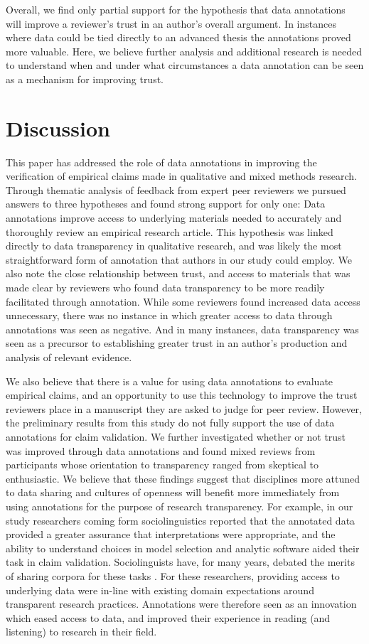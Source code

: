 \documentclass[sigchi]{acmart}
\begin{document}
Overall, we find only partial support for the hypothesis that data annotations will improve a reviewer’s trust in an author’s overall argument. In instances where data could be tied directly to an advanced thesis the annotations proved more valuable. Here, we believe further analysis and additional research is needed to understand when and under what circumstances a data annotation can be seen as a mechanism for improving trust.  

\section{Discussion}
This paper has addressed the role of data annotations in improving the verification of empirical claims made in qualitative and mixed methods research. Through thematic analysis of feedback from expert peer reviewers we pursued answers to three hypotheses and found strong support for only one: Data annotations improve access to underlying materials needed to accurately and thoroughly review an empirical research article. This hypothesis was linked directly to data transparency in qualitative research, and was likely the most straightforward form of annotation that authors in our study could employ. We also note the close relationship between trust, and access to materials that was made clear by reviewers who found data transparency to be more readily facilitated through annotation. While some reviewers found increased data access unnecessary, there was no instance in which greater access to data through annotations was seen as negative. And in many instances, data transparency was seen as a precursor to establishing greater trust in an author's production and analysis of relevant evidence. 

We also believe that there is a value for using data annotations to evaluate empirical claims, and an opportunity to use this technology to improve the trust reviewers place in a manuscript they are asked to judge for peer review. However, the preliminary results from this study do not fully support the use of data annotations for claim validation. We further investigated whether or not trust was improved through data annotations and found mixed reviews from participants whose orientation to transparency ranged from skeptical to enthusiastic. We believe that these findings suggest that disciplines more attuned to data sharing and cultures of openness will benefit more immediately from using annotations for the purpose of research transparency. For example, in our study researchers coming form sociolinguistics reported that the annotated data provided a greater assurance that interpretations were appropriate, and the ability to understand choices in model selection and analytic software aided their task in claim validation. Sociolinguists have, for many years, debated the merits of sharing corpora for these tasks \cite{anderson2008corpus}. For these researchers, providing access to underlying data were in-line with existing domain expectations around transparent research practices. Annotations were therefore seen as an innovation which eased access to data, and improved their experience in reading (and listening) to research in their field. 
\end{document}
